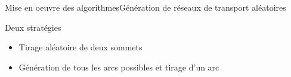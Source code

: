\begin{frame}{Mise en oeuvre des algorithmes}{Génération de réseaux de transport aléatoires}
	\begin{block}{Deux stratégies}
  	\begin{itemize}
  		\item Tirage aléatoire de deux sommets
  		\item Génération de tous les arcs possibles et tirage d'un arc
  	\end{itemize}
	\end{block}
\end{frame}